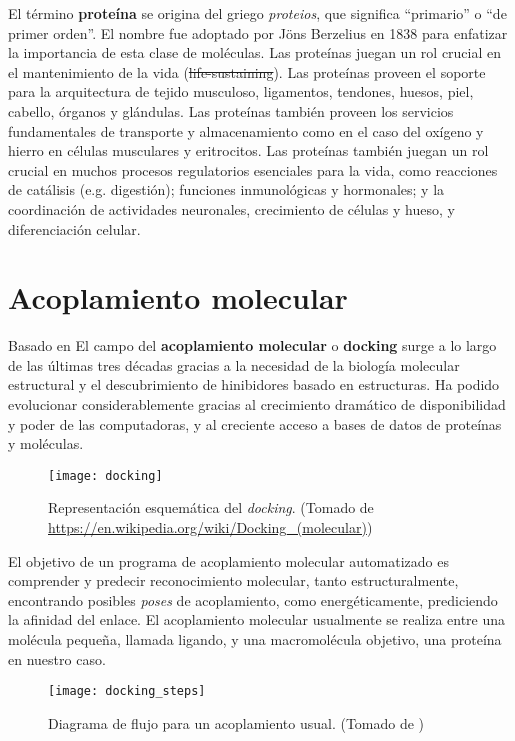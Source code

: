 El término \textbf{proteína} se origina del griego \textit{proteios},
que significa ``primario'' o ``de primer orden''. El nombre fue
adoptado por Jöns Berzelius en 1838 para enfatizar la importancia de
esta clase de moléculas. Las proteínas juegan un rol crucial en el
mantenimiento de la vida (\sout{life-sustaining}). Las proteínas proveen el
soporte para la arquitectura de tejido musculoso, ligamentos, tendones, huesos,
piel, cabello, órganos y glándulas. Las proteínas también proveen los servicios
fundamentales de transporte y almacenamiento como en el caso del oxígeno y
hierro en células musculares y eritrocitos. Las proteínas también juegan un rol
crucial en muchos procesos regulatorios esenciales para la vida, como reacciones
de catálisis (e.g. digestión); funciones inmunológicas y hormonales; y la
coordinación de actividades neuronales, crecimiento de células y hueso, y
diferenciación celular.\cite{tamar}

\section{Acoplamiento molecular}
Basado en \cite{kukol} El campo del \textbf{acoplamiento molecular} o
\textbf{docking} surge a lo largo de las últimas tres décadas gracias a la
necesidad de la biología molecular estructural y el descubrimiento de
hinibidores basado en estructuras. Ha podido evolucionar considerablemente
gracias al crecimiento dramático de disponibilidad y poder de las computadoras,
y al creciente acceso a bases de datos de proteínas y moléculas.

\begin{figure}[H]
  \texttt{[image: docking]} \centering
  \caption{Representación esquemática del \textit{docking}.  (Tomado de
    \url{https://en.wikipedia.org/wiki/Docking_(molecular)})}
\end{figure}

El objetivo de un programa de acoplamiento molecular automatizado es comprender
y predecir reconocimiento molecular, tanto estructuralmente, encontrando
posibles \textit{poses} de acoplamiento, como energéticamente, prediciendo la
afinidad del enlace. El acoplamiento molecular usualmente se realiza entre una
molécula pequeña, llamada ligando, y una macromolécula objetivo, una proteína en
nuestro caso.

\begin{figure}[H]
  \texttt{[image: docking\_steps]}
  \caption{Diagrama de flujo para un acoplamiento usual.  (Tomado de
    \cite{kukol})}
  \label{fig:docking_flowchart}
\end{figure}

